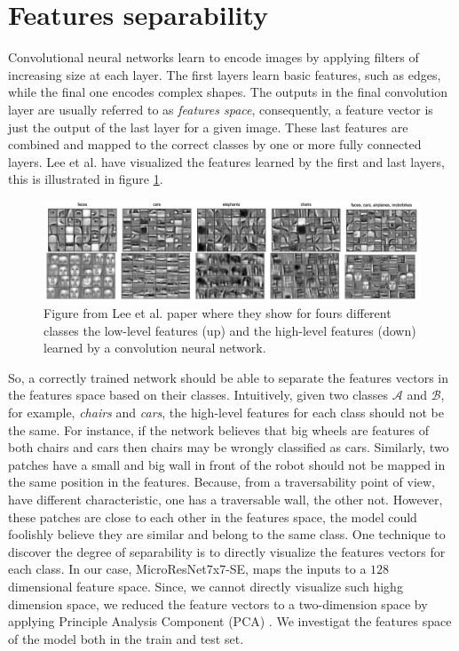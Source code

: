 \documentclass[../document.tex]{subfiles}
\begin{document}
\section{Features separability}
\label{sec: features-separability}
Convolutional neural networks learn to encode images by applying filters of increasing size at each layer. The first layers learn basic features, such as edges, while the final one encodes complex shapes. The outputs in the final convolution layer are usually referred to as \emph{features space}, consequently, a feature vector is just the output of the last layer for a given image. These last features are combined and mapped to the correct classes by one or more fully connected layers. Lee et al. \cite{deepbelief} have visualized the features learned by the first and last layers, this is illustrated in figure \ref{fig : layers-features}.
\begin{figure} [htbp]
    \centering
    \includegraphics[width=\linewidth]{../img/5/deep_belief.png}
    \caption{Figure from Lee et al. \cite{deepbelief} paper where they show for fours different classes the low-level features (up) and the high-level features (down) learned by a convolution neural network.}
    \label{fig : layers-features}
\end{figure}
So, a correctly trained network should be able to separate the features vectors in the features space based on their classes. Intuitively, given two classes $\mathcal{A}$ and $\mathcal{B}$, for example, \emph{chairs} and \emph{cars}, the high-level features for each class should not be the same. For instance, if the network believes that big wheels are features of both chairs and cars then chairs may be wrongly classified as cars. Similarly, two patches have a small and big wall in front of the robot should not be mapped in the same position in the features. Because, from a traversability point of view, have different characteristic, one has a traversable wall, the other not. However, these patches are close to each other in the features space, the model could foolishly believe they are similar and belong to the same class.
One technique to discover the degree of separability is to directly visualize the features vectors for each class. In our case,  MicroResNet7x7-SE, maps the inputs to a $128$ dimensional feature space.  Since, we cannot directly visualize such highg dimension space, we reduced the feature vectors to a two-dimension space by applying Principle Analysis Component (PCA) \cite{pca}. We investigat the features space of the model both in the train and test set.
\end{document}
